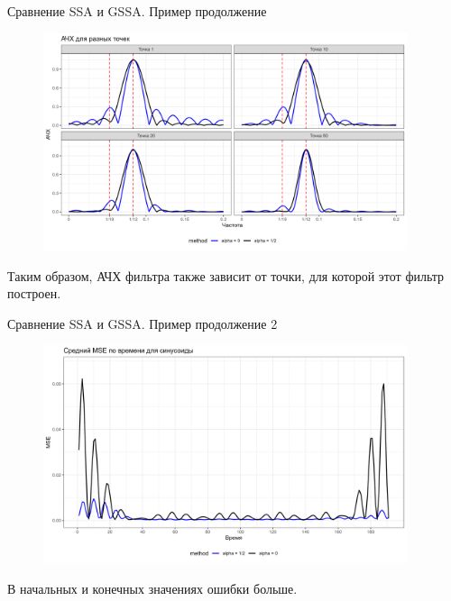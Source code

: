 \documentclass[notheorems, handout]{beamer}
\begin{document}
\begin{frame}{Сравнение SSA и GSSA. Пример продолжение}
	\begin{figure}[ht]
		\centering
		\includegraphics[width=0.95\textwidth]{img/trend inseparability example/afc_4_points.png}
	\end{figure}
	Таким образом, АЧХ фильтра также зависит от точки, для которой этот фильтр построен.
\end{frame}

\begin{frame}{Сравнение SSA и GSSA. Пример продолжение 2}
	\begin{figure}[ht]
		\centering
		\includegraphics[width=0.95\textwidth]{img/trend inseparability example/mse_y1_time.png}
	\end{figure}
	В начальных и конечных значениях ошибки больше.
\end{frame}
\end{document}
